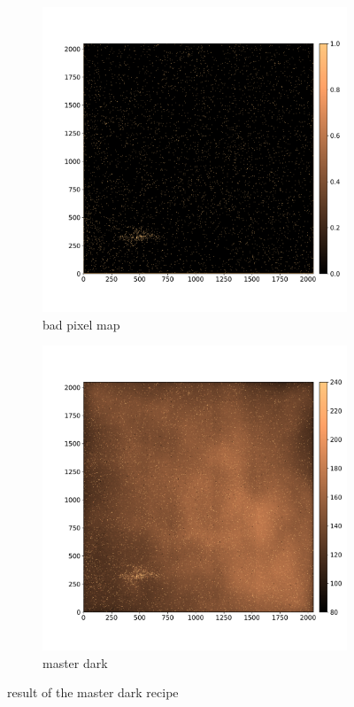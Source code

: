 \documentclass[twoside,single]{lion-msc}
\begin{document}
\begin{figure}[!htbp]
\centering
\begin{subfigure}{.5\textwidth}
  \centering
  \includegraphics[width=1\linewidth]{badpixelmap}
  \caption{bad pixel map}
\end{subfigure}%
\begin{subfigure}{.5\textwidth}
  \centering
  \includegraphics[width=1\linewidth]{dark}
  \caption{master dark}
\end{subfigure}
\caption{result of the master dark recipe}
\label{fig:masterdark}
\end{figure}
\end{document}
